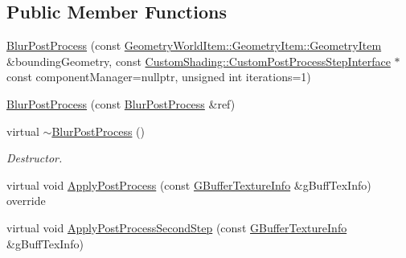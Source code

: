 \subsection*{Public Member Functions}
\begin{DoxyCompactItemize}
\item 
\mbox{\hyperlink{class_geometry_engine_1_1_geometry_post_process_1_1_double_pass_post_process_1_1_blur_post_process_ab7110b606555e9a5a4b7b1cbbd93b6d1}{Blur\+Post\+Process}} (const \mbox{\hyperlink{class_geometry_engine_1_1_geometry_world_item_1_1_geometry_item_1_1_geometry_item}{Geometry\+World\+Item\+::\+Geometry\+Item\+::\+Geometry\+Item}} \&bounding\+Geometry, const \mbox{\hyperlink{class_geometry_engine_1_1_custom_shading_1_1_custom_post_process_step_interface}{Custom\+Shading\+::\+Custom\+Post\+Process\+Step\+Interface}} $\ast$const component\+Manager=nullptr, unsigned int iterations=1)
\item 
\mbox{\hyperlink{class_geometry_engine_1_1_geometry_post_process_1_1_double_pass_post_process_1_1_blur_post_process_a5f65c74239f5bd31149d92a5f3617f32}{Blur\+Post\+Process}} (const \mbox{\hyperlink{class_geometry_engine_1_1_geometry_post_process_1_1_double_pass_post_process_1_1_blur_post_process}{Blur\+Post\+Process}} \&ref)
\item 
\mbox{\label{class_geometry_engine_1_1_geometry_post_process_1_1_double_pass_post_process_1_1_blur_post_process_a0803bdceb234cf50cba7003528afecbc}} 
virtual \mbox{\hyperlink{class_geometry_engine_1_1_geometry_post_process_1_1_double_pass_post_process_1_1_blur_post_process_a0803bdceb234cf50cba7003528afecbc}{$\sim$\+Blur\+Post\+Process}} ()
\begin{DoxyCompactList}\small\item\em Destructor. \end{DoxyCompactList}\item 
virtual void \mbox{\hyperlink{class_geometry_engine_1_1_geometry_post_process_1_1_double_pass_post_process_1_1_blur_post_process_a41f0c0b0fc02b05fccb8b765acd85ad0}{Apply\+Post\+Process}} (const \mbox{\hyperlink{class_geometry_engine_1_1_g_buffer_texture_info}{G\+Buffer\+Texture\+Info}} \&g\+Buff\+Tex\+Info) override
\item 
virtual void \mbox{\hyperlink{class_geometry_engine_1_1_geometry_post_process_1_1_double_pass_post_process_1_1_blur_post_process_abf5172d399252fcf42423548918e9433}{Apply\+Post\+Process\+Second\+Step}} (const \mbox{\hyperlink{class_geometry_engine_1_1_g_buffer_texture_info}{G\+Buffer\+Texture\+Info}} \&g\+Buff\+Tex\+Info)

\end{DoxyCompactItemize}
